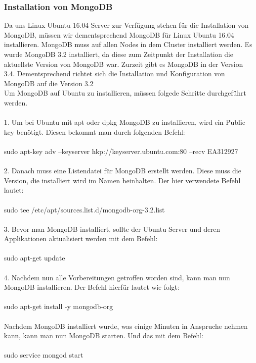\subsubsection{Installation von MongoDB}
Da uns Linux Ubuntu 16.04 Server zur Verf\"ugung stehen f\"ur die Installation von MongoDB, m\"ussen wir dementsprechend MongoDB f\"ur Linux Ubuntu 16.04 installieren. MongoDB muss auf allen Nodes in dem Cluster installiert werden. Es wurde MongoDB 3.2 installiert, da diese zum Zeitpunkt der Installation die aktuellste Version von MongoDB war. Zurzeit gibt es MongoDB in der Version 3.4. Dementsprechend richtet sich die Installation und Konfiguration von MongoDB auf die Version 3.2
\\
Um MongoDB auf Ubuntu zu installieren, m\"ussen folgede Schritte durchgef\"uhrt werden.
\\
\\
1.	Um bei Ubuntu mit apt oder dpkg MongoDB zu installieren, wird ein Public key ben\"otigt. Diesen bekommt man durch folgenden Befehl:
\\
\\
sudo apt-key adv --keyserver hkp://keyserver.ubuntu.com:80 --recv EA312927
\\
\\
2.	Danach muss eine Listendatei f\"ur MongoDB erstellt werden. Diese muss die Version, die installiert wird im Namen beinhalten. Der hier verwendete Befehl lautet:
\\
\\
sudo tee /etc/apt/sources.list.d/mongodb-org-3.2.list
\\
\\
3.	Bevor man MongoDB installiert, sollte der Ubuntu Server und deren Applikationen aktualisiert werden mit dem Befehl:
\\
\\
sudo apt-get update
\\
\\
4.	Nachdem nun alle Vorbereitungen getroffen worden sind, kann man nun MongoDB installieren. Der Befehl hierf\"ur lautet wie folgt:
\\
\\
sudo apt-get install -y mongodb-org
\\
\\
Nachdem MongoDB installiert wurde, was einige Minuten in Anspruche nehmen kann, kann man nun MongoDB starten. Und das mit dem Befehl: 
\\
\\
sudo service mongod start
\\
